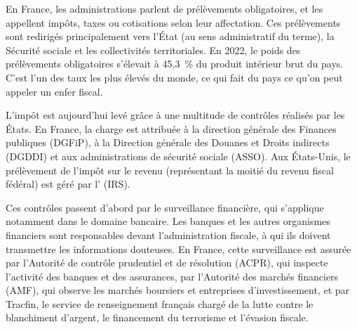 En France, les administrations parlent de prélèvements obligatoires, et les appellent impôts, taxes ou cotisations selon leur affectation. Ces prélèvements sont redirigés principalement vers l'État (au sens administratif du terme), la Sécurité sociale et les collectivités territoriales. En 2022, le poids des prélèvements obligatoires s'élevait à 45,3~\% du produit intérieur brut du pays. C'est l'un des taux les plus élevés du monde, ce qui fait du pays ce qu'on peut appeler un enfer fiscal.


L'impôt est aujourd'hui levé grâce à une multitude de contrôles réalisés par les États. En France, la charge est attribuée à la direction générale des Finances publiques (DGFiP), à la Direction générale des Douanes et Droits indirects (DGDDI) et aux administrations de sécurité sociale (ASSO). Aux États-Unis, le prélèvement de l'impôt sur le revenu (représentant la moitié du revenu fiscal fédéral) est géré par l' (IRS).

Ces contrôles passent d'abord par le surveillance financière, qui s'applique notamment dans le domaine bancaire. Les banques et les autres organismes financiers sont responsables devant l'administration fiscale, à qui ils doivent transmettre les informations douteuses. En France, cette surveillance est assurée par l'Autorité de contrôle prudentiel et de résolution (ACPR), qui inspecte l'activité des banques et des assurances, par l'Autorité des marchés financiers (AMF), qui observe les marchés boursiers et entreprises d'investissement, et par Tracfin, le service de renseignement français chargé de la lutte contre le blanchiment d'argent, le financement du terrorisme et l'évasion fiscale.

